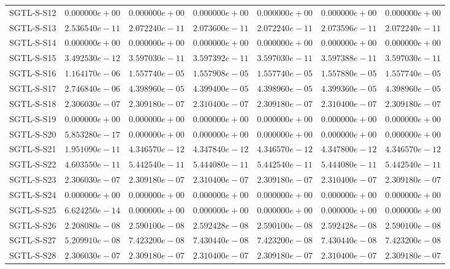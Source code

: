 \begin{longtable}{lrrrrrr}
SGTL-S-S12 & $0.000000e+00$ & $0.000000e+00$ & $0.000000e+00$ & $0.000000e+00$ & $0.000000e+00$ & $0.000000e+00$ \\
SGTL-S-S13 & $2.536540e-11$ & $2.072240e-11$ & $2.073600e-11$ & $2.072240e-11$ & $2.073596e-11$ & $2.072240e-11$ \\
SGTL-S-S14 & $0.000000e+00$ & $0.000000e+00$ & $0.000000e+00$ & $0.000000e+00$ & $0.000000e+00$ & $0.000000e+00$ \\
SGTL-S-S15 & $3.492530e-12$ & $3.597030e-11$ & $3.597392e-11$ & $3.597030e-11$ & $3.597388e-11$ & $3.597030e-11$ \\
SGTL-S-S16 & $1.164170e-06$ & $1.557740e-05$ & $1.557908e-05$ & $1.557740e-05$ & $1.557880e-05$ & $1.557740e-05$ \\
SGTL-S-S17 & $2.746840e-06$ & $4.398960e-05$ & $4.399400e-05$ & $4.398960e-05$ & $4.399360e-05$ & $4.398960e-05$ \\
SGTL-S-S18 & $2.306030e-07$ & $2.309180e-07$ & $2.310400e-07$ & $2.309180e-07$ & $2.310400e-07$ & $2.309180e-07$ \\
SGTL-S-S19 & $0.000000e+00$ & $0.000000e+00$ & $0.000000e+00$ & $0.000000e+00$ & $0.000000e+00$ & $0.000000e+00$ \\
SGTL-S-S20 & $5.853280e-17$ & $0.000000e+00$ & $0.000000e+00$ & $0.000000e+00$ & $0.000000e+00$ & $0.000000e+00$ \\
SGTL-S-S21 & $1.951090e-11$ & $4.346570e-12$ & $4.347840e-12$ & $4.346570e-12$ & $4.347800e-12$ & $4.346570e-12$ \\
SGTL-S-S22 & $4.603550e-11$ & $5.442540e-11$ & $5.444080e-11$ & $5.442540e-11$ & $5.444080e-11$ & $5.442540e-11$ \\
SGTL-S-S23 & $2.306030e-07$ & $2.309180e-07$ & $2.310400e-07$ & $2.309180e-07$ & $2.310400e-07$ & $2.309180e-07$ \\
SGTL-S-S24 & $0.000000e+00$ & $0.000000e+00$ & $0.000000e+00$ & $0.000000e+00$ & $0.000000e+00$ & $0.000000e+00$ \\
SGTL-S-S25 & $6.624250e-14$ & $0.000000e+00$ & $0.000000e+00$ & $0.000000e+00$ & $0.000000e+00$ & $0.000000e+00$ \\
SGTL-S-S26 & $2.208080e-08$ & $2.590100e-08$ & $2.592428e-08$ & $2.590100e-08$ & $2.592428e-08$ & $2.590100e-08$ \\
SGTL-S-S27 & $5.209910e-08$ & $7.423200e-08$ & $7.430440e-08$ & $7.423200e-08$ & $7.430440e-08$ & $7.423200e-08$ \\
SGTL-S-S28 & $2.306030e-07$ & $2.309180e-07$ & $2.310400e-07$ & $2.309180e-07$ & $2.310400e-07$ & $2.309180e-07$ \\

\end{longtable}
